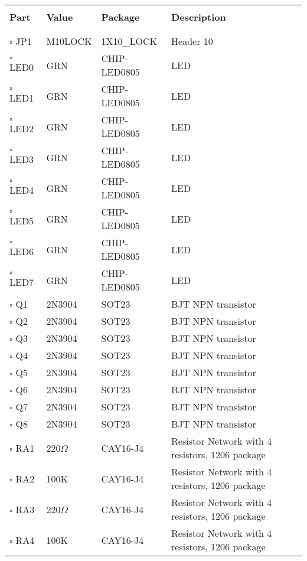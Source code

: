 \begin{tabular}{l l l p{3.5in} } 
\hline\\
\textbf{Part} & \textbf{Value} & \textbf{Package} & \textbf{Description} \\[3mm]
\hline\\\\[-7mm]
$\square$ JP1 & M10LOCK & 1X10\_LOCK & Header 10 \\
$\square$ LED0 & GRN & CHIP-LED0805 & LED \\
$\square$ LED1 & GRN & CHIP-LED0805 & LED \\
$\square$ LED2 & GRN & CHIP-LED0805 & LED \\
$\square$ LED3 & GRN & CHIP-LED0805 & LED \\
$\square$ LED4 & GRN & CHIP-LED0805 & LED \\
$\square$ LED5 & GRN & CHIP-LED0805 & LED \\
$\square$ LED6 & GRN & CHIP-LED0805 & LED \\
$\square$ LED7 & GRN & CHIP-LED0805 & LED \\
$\square$ Q1 & 2N3904 & SOT23 & BJT NPN transistor \\
$\square$ Q2 & 2N3904 & SOT23 & BJT NPN transistor \\
$\square$ Q3 & 2N3904 & SOT23 & BJT NPN transistor \\
$\square$ Q4 & 2N3904 & SOT23 & BJT NPN transistor \\
$\square$ Q5 & 2N3904 & SOT23 & BJT NPN transistor \\
$\square$ Q6 & 2N3904 & SOT23 & BJT NPN transistor \\
$\square$ Q7 & 2N3904 & SOT23 & BJT NPN transistor \\
$\square$ Q8 & 2N3904 & SOT23 & BJT NPN transistor \\
$\square$ RA1 & 220$\Omega$ & CAY16-J4 & Resistor Network with 4 resistors, 1206 package \\
$\square$ RA2 & 100K & CAY16-J4 & Resistor Network with 4 resistors, 1206 package \\
$\square$ RA3 & 220$\Omega$ & CAY16-J4 & Resistor Network with 4 resistors, 1206 package \\
$\square$ RA4 & 100K & CAY16-J4 & Resistor Network with 4 resistors, 1206 package \\
\end{tabular}
